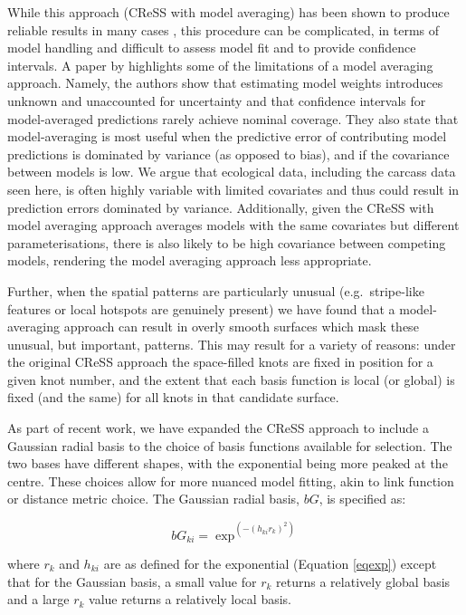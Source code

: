\documentclass[letterpaper]{interact}
\begin{document}
While this approach (CReSS with model averaging) has been shown to produce reliable results in many cases \citep{scott2014}, this procedure can be complicated, in terms of model handling and difficult to assess model fit and to provide confidence intervals. A paper by \citet{dormann2018} highlights some of the limitations of a model averaging approach. Namely, the authors show that estimating model weights introduces unknown and unaccounted for uncertainty and that confidence intervals for model-averaged predictions rarely achieve nominal coverage. They also state that model-averaging is most useful when the predictive error of contributing model predictions is dominated by variance (as opposed to bias), and if the covariance between models is low. We argue that ecological data, including the carcass data seen here, is often highly variable with limited covariates and thus could result in prediction errors dominated by variance. Additionally, given the CReSS with model averaging approach averages models with the same covariates but different parameterisations, there is also likely to be high covariance between competing models, rendering the model averaging approach less appropriate.

Further, when the spatial patterns are particularly unusual (e.g.~stripe-like features or local hotspots are genuinely present) we have found that a model-averaging approach can result in overly smooth surfaces which mask these unusual, but important, patterns. This may result for a variety of reasons: under the original CReSS approach the space-filled knots are fixed in position for a given knot number, and the extent that each basis function is local (or global) is fixed (and the same) for all knots in that candidate surface.

As part of recent work, we have expanded the CReSS approach to include a Gaussian radial basis to the choice of basis functions available for selection. The two bases have different shapes, with the exponential being more peaked at the centre.  These choices allow for more nuanced model fitting, akin to link function or distance metric choice. The Gaussian radial basis, \(bG\), is specified as:

\begin{equation}\label{eqgau}
bG_{ki} = \exp^{(-(h_{ki}r_k)^2)}
\end{equation}

where \(r_k\) and \(h_{ki}\) are as defined for the exponential (Equation \ref{eqexp}) except that for the Gaussian basis, a small value for \(r_k\) returns a relatively global basis and a large \(r_k\) value returns a relatively local basis.
\end{document}

